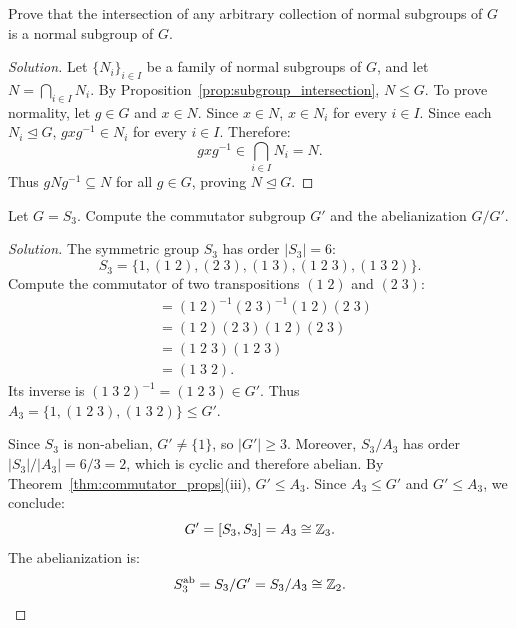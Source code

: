 \begin{problem}
Prove that the intersection of any arbitrary collection of normal subgroups of $G$ is a normal subgroup of $G$.
\end{problem}

\begin{proof}[Solution]
Let $\{ N_i \}_{i \in I}$ be a family of normal subgroups of $G$, and let $N = \bigcap_{i \in I} N_i$.
By Proposition~\ref{prop:subgroup_intersection}, $N \le G$.
To prove normality, let $g \in G$ and $x \in N$.
Since $x \in N$, $x \in N_i$ for every $i \in I$.
Since each $N_i \trianglelefteq G$, $gxg^{-1} \in N_i$ for every $i \in I$.
Therefore:
\begin{equation*}
gxg^{-1} \in \bigcap_{i \in I} N_i = N.
\end{equation*}
Thus $gNg^{-1} \subseteq N$ for all $g \in G$, proving $N \trianglelefteq G$.
\end{proof}

\begin{problem}
Let $G = S_3$. Compute the commutator subgroup $G'$ and the abelianization $G/G'$.
\end{problem}

\begin{proof}[Solution]
The symmetric group $S_3$ has order $|S_3| = 6$:
\begin{equation*}
S_3 = \{ 1, (1 \; 2), (2 \; 3), (1 \; 3), (1 \; 2 \; 3), (1 \; 3 \; 2) \}.
\end{equation*}
Compute the commutator of two transpositions $(1 \; 2)$ and $(2 \; 3)$:
\begin{align*}
[(1 \; 2), (2 \; 3)] &= (1 \; 2)^{-1}(2 \; 3)^{-1}(1 \; 2)(2 \; 3) \\
&= (1 \; 2)(2 \; 3)(1 \; 2)(2 \; 3) \\
&= (1 \; 2 \; 3)(1 \; 2 \; 3) \\
&= (1 \; 3 \; 2).
\end{align*}
Its inverse is $(1 \; 3 \; 2)^{-1} = (1 \; 2 \; 3) \in G'$.
Thus $A_3 = \{ 1, (1 \; 2 \; 3), (1 \; 3 \; 2) \} \le G'$.

Since $S_3$ is non-abelian, $G' \ne \{1\}$, so $|G'| \ge 3$.
Moreover, $S_3 / A_3$ has order $|S_3|/|A_3| = 6/3 = 2$, which is cyclic and therefore abelian.
By Theorem~\ref{thm:commutator_props}(iii), $G' \le A_3$.
Since $A_3 \le G'$ and $G' \le A_3$, we conclude:
\begin{equation*}
G' = [S_3, S_3] = A_3 \cong \mathbb{Z}_3.
\end{equation*}
The abelianization is:
\begin{equation*}
S_3^{\text{ab}} = S_3 / G' = S_3 / A_3 \cong \mathbb{Z}_2.
\end{equation*}
\end{proof}

